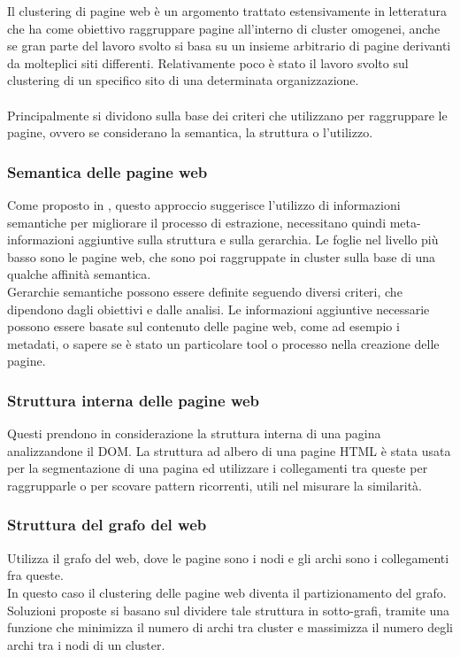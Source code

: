 


Il clustering di pagine web è un argomento trattato estensivamente in letteratura che ha come obiettivo raggruppare pagine all'interno di cluster omogenei, anche se gran parte del lavoro svolto si basa su un insieme arbitrario di pagine derivanti da molteplici siti differenti. Relativamente poco è stato il lavoro svolto sul clustering di un specifico sito di una determinata organizzazione.
\\\\
Principalmente si dividono sulla base dei criteri che utilizzano per raggruppare le pagine, ovvero se considerano la semantica, la struttura o l'utilizzo.

\subsubsection{Semantica delle pagine web}
Come proposto in \cite{Cooley03}, questo approccio suggerisce l'utilizzo di informazioni semantiche per migliorare il processo di estrazione, necessitano quindi meta-informazioni aggiuntive sulla struttura e sulla gerarchia. Le foglie nel livello più basso sono le pagine web, che sono poi raggruppate in cluster sulla base di una qualche affinità semantica. 
\\
Gerarchie semantiche possono essere definite seguendo diversi criteri, che dipendono dagli obiettivi e dalle analisi. Le informazioni aggiuntive necessarie possono essere basate sul contenuto delle pagine web, come ad esempio i metadati, o sapere se è stato un particolare tool o processo nella creazione delle pagine.

\subsubsection{Struttura interna delle pagine web}
Questi prendono in considerazione la struttura interna di una pagina analizzandone il DOM. La struttura ad albero di una pagine HTML è stata usata per la segmentazione di una pagina ed utilizzare i collegamenti tra queste per raggrupparle \cite{Lin10} o per scovare pattern \cite{Kudelka08} ricorrenti, utili nel misurare la similarità.

\subsubsection{Struttura del grafo del web}
Utilizza il grafo del web, dove le pagine sono i nodi e gli archi sono i collegamenti fra queste.
\\
In questo caso il clustering delle pagine web diventa il partizionamento del grafo. Soluzioni proposte \cite{Luxburg07} si basano sul dividere tale struttura in sotto-grafi, tramite una funzione che minimizza il numero di archi tra cluster e massimizza il numero degli archi tra i nodi di un cluster.

